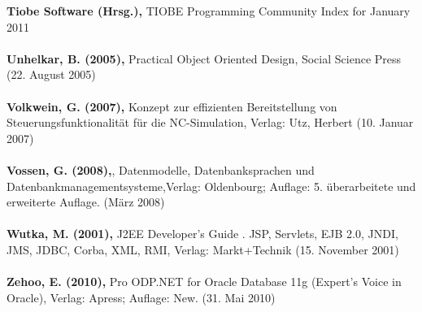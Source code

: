 \textbf{Tiobe Software (Hrsg.),} TIOBE Programming Community Index for January 2011\\\\
\textbf{Unhelkar, B. (2005),} Practical Object Oriented Design, Social Science Press (22. August 2005)\\\\
\textbf{Volkwein, G. (2007),} Konzept zur effizienten Bereitstellung von Steuerungsfunktionalität für die NC-Simulation, Verlag: Utz, Herbert (10. Januar 2007)\\\\
\textbf{Vossen, G. (2008),}, Datenmodelle, Datenbanksprachen und Datenbankmanagementsysteme,Verlag: Oldenbourg; Auflage: 5. überarbeitete und erweiterte Auflage. (März 2008)\\\\
\textbf{Wutka, M. (2001),} J2EE Developer's Guide . JSP, Servlets, EJB 2.0, JNDI, JMS, JDBC, Corba, XML, RMI, Verlag: Markt+Technik (15. November 2001)\\\\
\textbf{Zehoo, E. (2010),} Pro ODP.NET for Oracle Database 11g (Expert's Voice in Oracle), Verlag: Apress; Auflage: New. (31. Mai 2010)\\\\

